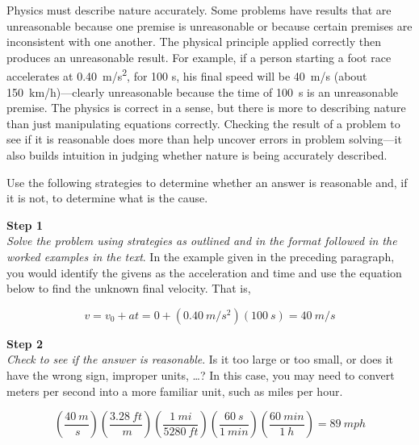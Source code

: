\documentclass[main-ap-physics.tex]{subfiles}
\begin{document}
Physics must describe nature accurately. Some problems have results that are unreasonable because one premise is unreasonable or because certain premises are inconsistent with one another. The physical principle applied correctly then produces an unreasonable result. For example, if a person starting a foot race accelerates at \SI{0.40}{m/s^2}, for 100 s, his final speed will be \SI{40}{m/s} (about \SI{150}{km/h})---clearly unreasonable because the time of \SI{100}{s} is an unreasonable premise. The physics is correct in a sense, but there is more to describing nature than just manipulating equations correctly. Checking the result of a problem to see if it is reasonable does more than help uncover errors in problem solving---it also builds intuition in judging whether nature is being accurately described.

\vspace{1em}

Use the following strategies to determine whether an answer is reasonable and, if it is not, to determine what is the cause.

\vspace{1em}

\textbf{Step 1}\\
\textit{Solve the problem using strategies as outlined and in the format followed in the worked examples in the text}. In the example given in the preceding paragraph, you would identify the givens as the acceleration and time and use the equation below to find the unknown final velocity. That is,

\begin{equation*}
    v = v_0 + at = 0 + \left(\SI{0.40}{m/s^2}\right) \left(\SI{100}{s}\right) = \SI{40}{m/s}
\end{equation*}

\textbf{Step 2}\\
\textit{Check to see if the answer is reasonable}. Is it too large or too small, or does it have the wrong sign, improper units, \ldots ? In this case, you may need to convert meters per second into a more familiar unit, such as miles per hour.

\begin{equation*}
    \left(\frac{\SI{40}{m}}{\SI{}{s}}\right)
    \left(\frac{\SI{3.28}{ft}}{\SI{}{m}}\right)
    \left(\frac{\SI{1}{mi}}{\SI{5280}{ft}}\right)
    \left(\frac{\SI{60}{s}}{\SI{1}{min}}\right)
    \left(\frac{\SI{60}{min}}{\SI{1}{h}}\right)
    = \SI{89}{mph}
\end{equation*}
\end{document}

